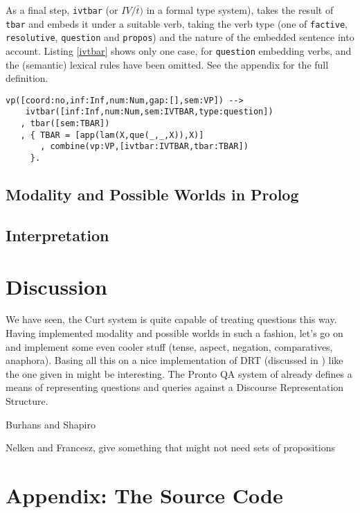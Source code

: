 \documentclass[notitlepage,twoside,a4paper]{scrreprt}
\newcommand{\abbr}{\textsf} %
\newcommand{\code}[1]{\texttt{#1}} %
\newcommand{\pn}{\textsf} %
\newcommand{\curt}{\pn{Curt}}
\newcommand{\prol}{\pn{Prolog}}
\theoremstyle{remark}
\theoremstyle{remark}
\theoremstyle{definition}
\theoremstyle{definition}
\begin{document}
As a final step, \code{ivtbar} (or $IV/\bar{t})$ in a formal type system), takes
the result of \code{tbar} and embeds it under a suitable verb, taking the verb
type (one of \code{factive}, \code{resolutive}, \code{question} and
\code{propos}) and the nature of the embedded sentence into account. Listing
\ref{ivtbar} shows only one case, for \code{question} embedding verbs, and the
(semantic) lexical rules have been omitted. See the
appendix %
for the full definition.

\begin{lstlisting}[label=ivtbar,caption={A question embedding VP requires its antecedent to be a question.},float]
vp([coord:no,inf:Inf,num:Num,gap:[],sem:VP]) -->
    ivtbar([inf:Inf,num:Num,sem:IVTBAR,type:question])
   , tbar([sem:TBAR])
   , { TBAR = [app(lam(X,que(_,_,X)),X)]
       , combine(vp:VP,[ivtbar:IVTBAR,tbar:TBAR])
     }.
\end{lstlisting}

\section{Modality and Possible Worlds in \prol{}}
\label{sec:indices}

\section{Interpretation}

\chapter{Discussion}\label{sec:discussion}

We have seen, the \curt{} system is quite capable of treating questions this way.
Having implemented modality and possible worlds in such a fashion, let's go on
and implement some even cooler stuff (tense, aspect, negation, comparatives,
anaphora). Basing all this on a nice implementation of DRT (discussed in
\cite{kampreyle:drt}) like the one given in \cite{blackburnbos:cl2} might be
interesting. The Pronto \abbr{QA} system of \cite{prontoqa} already defines a
means of representing questions and queries against a Discourse Representation
Structure.

Burhans and Shapiro

Nelken and Francesz, give something that might not need sets of propositions

\appendix

\chapter{Appendix: The Source Code}
\end{document}
